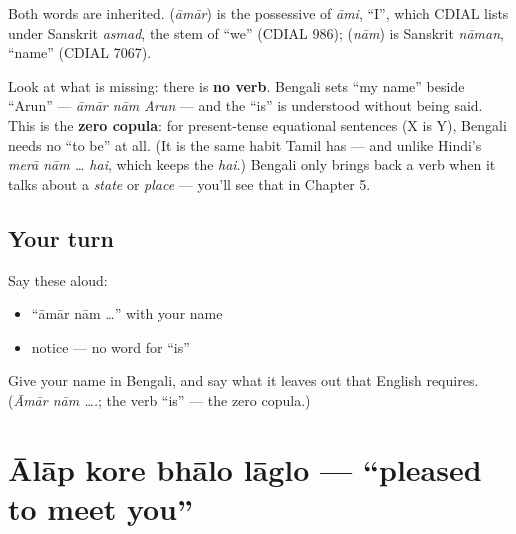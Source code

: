 \begin{cousinweb}
Both words are inherited. \textbf{} (\emph{āmār}) is the possessive of \emph{āmi}, \textquotedblleft{}I\textquotedblright{}, which CDIAL lists under Sanskrit \emph{asmad}, the stem of \textquotedblleft{}we\textquotedblright{} (CDIAL 986); \textbf{} (\emph{nām}) is Sanskrit \emph{nāman}, \textquotedblleft{}name\textquotedblright{} (CDIAL 7067).
\end{cousinweb}

\begin{grammarlens}[title={Grammar Lens: Bengali drops \textquotedblleft{}is\textquotedblright{} in the present}]
Look at what is missing: there is \textbf{no verb}. Bengali sets \textquotedblleft{}my name\textquotedblright{} beside \textquotedblleft{}Arun\textquotedblright{} — \emph{āmār nām Arun} — and the \textquotedblleft{}is\textquotedblright{} is understood without being said. This is the \textbf{zero copula}: for present-tense equational sentences (X is Y), Bengali needs no \textquotedblleft{}to be\textquotedblright{} at all. (It is the same habit Tamil has — and unlike Hindi's \emph{merā nām … hai}, which keeps the \emph{hai}.) Bengali only brings back a verb when it talks about a \emph{state} or \emph{place} — you'll see that in Chapter 5.
\end{grammarlens}

\subsection*{Your turn}
Say these aloud:

\begin{itemize}
\raggedright
  \item \textquotedblleft{}āmār nām …\textquotedblright{} with your name
  \item notice — no word for \textquotedblleft{}is\textquotedblright{}
\end{itemize}

\begin{tcolorbox}[breakable,colback=teal!4,colframe=teal!35!black,title={Before you move on}]
Give your name in Bengali, and say what it leaves out that English requires. (\emph{Āmār nām ….}; the verb \textquotedblleft{}is\textquotedblright{} — the zero copula.)
\end{tcolorbox}
\section[\texorpdfstring{\bn{আলাপ} \bn{করে} \bn{ভালো} … (ālāp kore bhālo …)}{আলাপ করে ভালো … (ālāp kore bhālo …)}]{Ālāp kore bhālo lāglo — \textquotedblleft{}pleased to meet you\textquotedblright{}}

